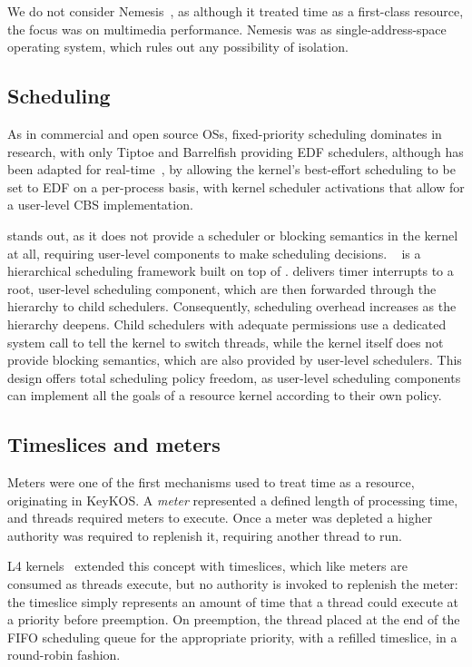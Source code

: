 We do not consider Nemesis~\citep{Leslie_MBRBEFH_96}, as although it treated time as a first-class
resource, the focus was on multimedia performance. Nemesis was as single-address-space operating
system, which rules out any possibility of isolation.

\subsection{Scheduling}

As in commercial and open source \glspl{OS}, fixed-priority scheduling dominates in research, with
only Tiptoe and Barrelfish providing \gls{EDF} schedulers, although \minix has been adapted for 
real-time~\citep{Mancina_LFHGT_09}, by allowing the kernel's best-effort scheduling to be
set to \gls{EDF} on a per-process basis, with kernel scheduler activations that allow for a
user-level \gls{CBS} implementation.    

\composite stands out, as it does not provide a scheduler or blocking semantics in the kernel at all,
requiring user-level
components to make scheduling decisions. \hires~\citep{Parmer_West_11} is a hierarchical scheduling framework built on top
of \composite. 
 \hires delivers timer interrupts to a root, user-level scheduling component, which are then forwarded
through the hierarchy to child schedulers.  Consequently, scheduling overhead increases as the
hierarchy deepens.  Child schedulers with adequate permissions use a dedicated system call to tell
the kernel to switch threads, while the kernel itself does not provide blocking semantics, which are also
provided by user-level schedulers.  This design offers total scheduling policy freedom, as
user-level scheduling components can implement all the goals of a resource kernel according to
their own policy.

\subsection{Timeslices and meters}
\label{s:timeslices-and-meters}

Meters were one of the first mechanisms used to treat time as a resource, originating 
in KeyKOS. A \emph{meter} represented a
defined length of processing time, and threads required meters to execute. Once a meter was
depleted a higher authority was required to replenish it, requiring another thread to run.

L4 kernels~\citep{Elphinstone_Heiser_13} extended this concept with timeslices, 
which like meters are consumed as threads execute, but no
authority is invoked to replenish the meter: the timeslice simply represents an amount of time 
that a thread could execute at a priority before preemption. 
On preemption, the thread placed at the end of
the \gls{FIFO} scheduling queue for the appropriate priority, with a refilled timeslice, in a
round-robin fashion. 


